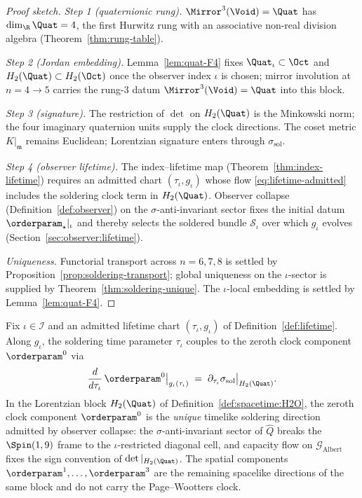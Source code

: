 \begin{proof}[Proof sketch]
\emph{Step 1 (quaternionic rung).} $\Mirror^3(\Void)=\Quat$ has
$\dim_{\R}\Quat=4$, the first Hurwitz rung with an associative non-real
division algebra (Theorem~\ref{thm:rung-table}).

\emph{Step 2 (Jordan embedding).} Lemma~\ref{lem:quat-F4} fixes
$\Quat_\iota\subset\Oct$ and $H_2(\Quat)\subset H_2(\Oct)$ once the
observer index $\iota$ is chosen; mirror involution at $n=4\to5$ carries
the rung-$3$ datum $\Mirror^3(\Void)=\Quat$ into this block.

\emph{Step 3 (signature).} The restriction of $\det$ on $H_2(\Quat)$ is the
Minkowski norm; the four imaginary quaternion units supply the clock
directions. The coset metric $K|_{\mathfrak{m}}$ remains Euclidean;
Lorentzian signature enters through $\sigma_{\mathrm{sol}}$.

\emph{Step 4 (observer lifetime).} The index--lifetime map
(Theorem~\ref{thm:index-lifetime}) requires an admitted chart
$(\tau_\iota,g_\iota)$ whose flow \eqref{eq:lifetime-admitted} includes the
soldering clock term in $H_2(\Quat)$. Observer collapse
(Definition~\ref{def:observer}) on the $\sigma$-anti-invariant sector fixes
the initial datum $\orderparam_\star|_\iota$ and thereby selects the soldered
bundle $\mathcal{S}_\iota$ over which $g_\iota$ evolves
(Section~\ref{sec:observer:lifetime}).

\emph{Uniqueness.} Functorial transport across $n=6,7,8$ is settled by
Proposition~\ref{prop:soldering-transport}; global uniqueness on the
$\iota$-sector is supplied by Theorem~\ref{thm:soldering-unique}. The
$\iota$-local embedding is settled by Lemma~\ref{lem:quat-F4}.
\end{proof}

\begin{proposition}
\label{prop:soldering-clock}
Fix $\iota\in\mathcal{I}$ and an admitted lifetime chart
$(\tau_\iota,g_\iota)$ of Definition~\ref{def:lifetime}. Along $g_\iota$,
the soldering time parameter $\tau_\iota$ couples to the zeroth clock
component $\orderparam^0$ via
\begin{equation}\label{eq:soldering-clock}
  \frac{d}{d\tau_\iota}\,\orderparam^0\big|_{g_\iota(\tau_\iota)}
  \;=\;
  \partial_{\tau_\iota}\sigma_{\mathrm{sol}}\big|_{H_2(\Quat)}.
\end{equation}
In the Lorentzian block $H_2(\Quat)$ of
Definition~\ref{def:spacetime:H2O}, the zeroth clock component
$\orderparam^0$ is the \emph{unique} timelike soldering direction admitted
by observer collapse: the $\sigma$-anti-invariant sector of $\hat Q$
breaks the $\Spin(1,9)$ frame to the $\iota$-restricted diagonal cell, and
capacity flow on $\mathcal{G}_{\mathrm{Albert}}$ fixes the sign convention
of $\det|_{H_2(\Quat)}$. The spatial components
$\orderparam^1,\ldots,\orderparam^3$ are the remaining spacelike directions
of the same block and do not carry the Page--Wootters clock.
\end{proposition}

